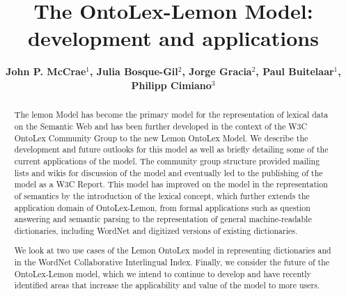 \documentclass[12pt,a4paper]{elex2017}
\begin{document}
\mainmatter
\title{The OntoLex-Lemon Model: development and applications}
\author{\bf John P. McCrae$^1$, Julia Bosque-Gil$^2$, Jorge Gracia$^2$, Paul
Buitelaar$^1$, Philipp Cimiano$^{3}$}

\maketitle

\begin{abstract}
The lemon Model has become the primary
model for the representation of lexical data on the Semantic Web and has been
further developed in the context of the W3C OntoLex Community Group to the new
    Lemon OntoLex Model.
We describe the development and future outlooks for this model as well
as briefly detailing some of the current applications of the model. 
The community group structure provided mailing lists and wikis
for discussion of the model and eventually led to the publishing of the model as
a W3C Report. This model has improved on the model in the representation of
    semantics by the introduction of the lexical concept, which
further
extends the application domain of OntoLex-Lemon, from formal applications such
as question answering and semantic parsing to the representation of general
machine-readable dictionaries, including WordNet and digitized versions of
existing dictionaries.

We look at two use cases of the Lemon OntoLex model in representing dictionaries
and in the WordNet Collaborative Interlingual Index.
Finally, we consider the future of the OntoLex-Lemon model, which we intend to
continue to develop and have recently identified areas that
increase the applicability and value of the model to more users.

\end{abstract}
\end{document}
